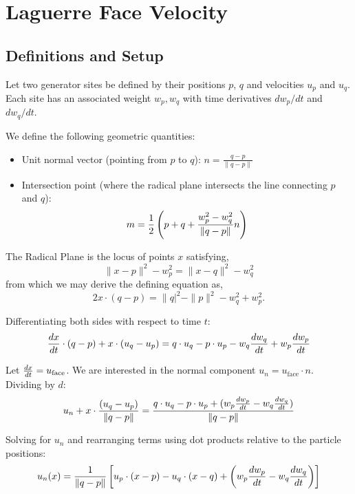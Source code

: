 \documentclass[twocolumn]{aastex63}
\begin{document}
\section{Laguerre Face Velocity}
\subsection{Definitions and Setup}

Let two generator sites be defined by their positions $p$, $q$ and velocities $u_p$ and $u_q$. Each site has an associated weight $w_p, w_q$ with time derivatives $dw_p/dt$ and $dw_q/dt$.

We define the following geometric quantities:
\begin{itemize}
    \item {Unit normal vector} (pointing from $p$ to $q$): ${n} = \frac{q-p}{\|q-p\|}$
    \item {Intersection point} (where the radical plane intersects the line connecting $p$ and $q$):
    \begin{equation}
        m = {1\over2}\left({{p} + {q}} + \frac{w_p^2 - w_q^2}{\|q-p\|} n\right)
    \end{equation}
\end{itemize}

The {Radical Plane} is  the locus of points $x$ satisfying,
\begin{equation}
   \|{x} - {p}\|^2 - w_p^2 = \|{x} - {q}\|^2 - w_q^2
\end{equation}
from which we may derive the defining equation as,
\begin{equation}
    2{x} \cdot ({q} - {p}) = \|{q}|^2 - \|{p}\|^2 - w_q^2 + w_p^2.
\end{equation}

Differentiating both sides with respect to time $t$:
\begin{equation}
    {dx\over dt} \cdot ({q} - {p}) + {x} \cdot ({u}_q - {u}_p) = {q} \cdot {u}_q - {p} \cdot {u}_p - w_q{dw_q\over dt } + w_p {dw_p\over dt}
\end{equation}

Let ${dx\over dt} = {u}_\textrm{face}$. We are interested in the normal component $u_n = {u}_\textrm{face} \cdot {n}$. Dividing by $d$:
\begin{equation}
    u_n + {x} \cdot \frac{({u}_q - u_p)}{\|q-p\|} = \frac{{q} \cdot {u}_q - {p} \cdot {u}_p + (w_p{dw_p\over dt} - w_q{dw_q\over dt})}{\|q-p\|}
\end{equation}

Solving for $u_n$ and rearranging terms using dot products relative to the particle positions:
\begin{equation}
    u_n({x}) = {1\over \|q-p\|}\left[{{u}_p \cdot ({x} - {p}) - {u}_q \cdot ({x} - {q}) + \left(w_p{dw_p\over dt} - w_q{dw_q\over dt}\right)} \right]
\end{equation}
\end{document}
